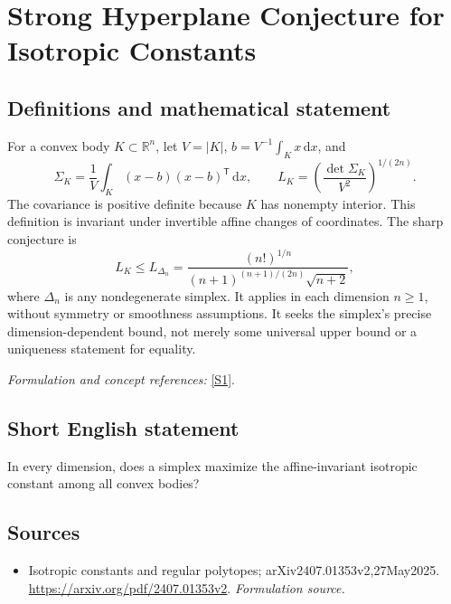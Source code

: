 \documentclass[11pt]{article}
\begin{document}
\section*{\texorpdfstring{Strong Hyperplane Conjecture for Isotropic Constants}{Strong Hyperplane Conjecture for Isotropic Constants}}\label{statement}
\subsection{Definitions and mathematical statement}
For a convex body $K\subset{\mathbb{R}}^n$, let $V=|K|$, $b=V^{-1}\int_Kx{\,\mathrm{d}} x$, and
\[
 \Sigma_K=\frac1V\int_K(x-b)(x-b)^{\mathsf T}{\,\mathrm{d}} x,
 \qquad L_K=\left(\frac{\det\Sigma_K}{V^2}\right)^{1/(2n)}.
\]
The covariance is positive definite because $K$ has nonempty interior. This definition is invariant under invertible affine changes of coordinates. The sharp conjecture is
\[
 L_K\le L_{\Delta_n}
 =\frac{(n!)^{1/n}}{(n+1)^{(n+1)/(2n)}\sqrt{n+2}},
\]
where $\Delta_n$ is any nondegenerate simplex. It applies in each dimension $n\ge1$, without symmetry or smoothness assumptions. It seeks the simplex's precise dimension-dependent bound, not merely some universal upper bound or a uniqueness statement for equality.
\par\smallskip\textit{Formulation and concept references:} \href{https://arxiv.org/pdf/2407.01353v2}{[S1]}.

\subsection{Short English statement}
In every dimension, does a simplex maximize the affine-invariant isotropic constant among all convex bodies?
\subsection{Sources}
\begin{itemize}
\item[S1]Isotropic constants and regular polytopes; arXiv2407.01353v2,27May2025.
\url{https://arxiv.org/pdf/2407.01353v2}.
\textit{Formulation source.}
\end{itemize}
\end{document}
